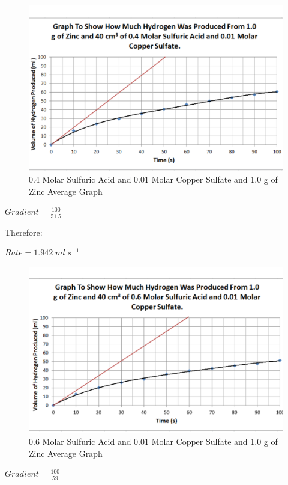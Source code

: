 \begin{figure}[H]
    \includegraphics[width=\textwidth]{./Analysis/Images/2Catalysed/04Molar.pdf}
    \caption{0.4 Molar Sulfuric Acid and 0.01 Molar Copper Sulfate and 1.0 g of Zinc Average Graph} \label{fig:04MolarSACSGradient}
\end{figure}

$Gradient = \frac{100}{51.5}$

Therefore:

$Rate = 1.942 \; ml \; s^{-1}$

\begin{figure}[H]
    \includegraphics[width=\textwidth]{./Analysis/Images/2Catalysed/06Molar.pdf}
    \caption{0.6 Molar Sulfuric Acid and 0.01 Molar Copper Sulfate and 1.0 g of Zinc Average Graph} \label{fig:06MolarSACSGradient}
\end{figure}

$Gradient = \frac{100}{59}$

